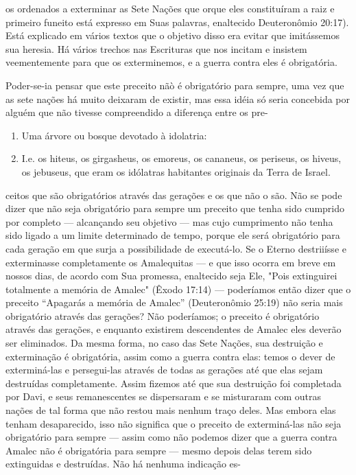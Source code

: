 os ordenados a exterminar as Sete Nações que orque eles constituíram a
raiz e primeiro fun­eito está expresso em Suas palavras, enaltecido
Deuteronômio 20:17). Está explicado em vários textos que o objetivo
disso era evitar que imitássemos sua heresia. Há vários trechos nas
Escrituras que nos incitam e insistem veementemente para que os
exterminemos, e a guerra contra eles é obrigatória.


Poder-se-ia pensar que este preceito nãò é obrigatório para sempre, uma
vez que as sete nações há muito deixaram de existir, mas essa idéia só
seria concebida por alguém que não tivesse compreendido a diferença
entre os pre-


\begin{enumerate}
\def\labelenumi{\arabic{enumi}.}
\setcounter{enumi}{191}
\item
 
 Uma árvore ou bosque devotado à idolatria:
 
\item
 
 I.e. os hiteus, os girgasheus, os emoreus, os cananeus, os periseus,
 os hiveus, os jebuseus, que eram os idólatras habitantes originais da
 Terra de Israel.
 
\end{enumerate}

ceitos que são obrigatórios através das gerações e os que não o são. Não
se po­de dizer que não seja obrigatório para sempre um preceito que
tenha sido cum­prido por completo --- alcançando seu objetivo --- mas
cujo cumprimento não tenha sido ligado a um limite determinado de tempo,
porque ele será obrigató­rio para cada geração em que surja a
possibilidade de executá-lo. Se o Eterno destriiísse e exterminasse
completamente os Amalequitas --- e que isso ocorra em breve em nossos
dias, de acordo com Sua promessa, enaltecido seja Ele, "Pois extinguirei
totalmente a memória de Amalec" (Êxodo 17:14) --- podería­mos então
dizer que o preceito ``Apagarás a memória de Amalec'' (Deuteronô­mio
25:19) não seria mais obrigatório através das gerações? Não poderíamos;
o preceito é obrigatório através das gerações, e enquanto existirem
descenden­tes de Amalec eles deverão ser eliminados. Da mesma forma, no
caso das Sete Nações, sua destruição e exterminação é obrigatória, assim
como a guerra con­tra elas: temos o dever de exterminá-las e
persegui-las através de todas as gera­ções até que elas sejam destruídas
completamente. Assim fizemos até que sua destruição foi completada por
Davi, e seus remanescentes se dispersaram e se misturaram com outras
nações de tal forma que não restou mais nenhum traço deles. Mas embora
elas tenham desaparecido, isso não significa que o preceito de
exterminá-las não seja obrigatório para sempre --- assim como não
podemos dizer que a guerra contra Amalec não é obrigatória para sempre
--- mesmo de­pois delas terem sido extinguidas e destruídas. Não há
nenhuma indicação es-

